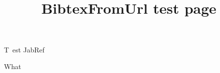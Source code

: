 \documentclass[12pt,a4paper]{article}
\begin{document}
\title{BibtexFromUrl test page}

\maketitle

T~\cite{html-50:online}est\cite{test1} \cite{test2} \cite{select} JabRef~\cite{JabRe89:online}

What~\cite{Whyarega29:online} 

\raggedright

\end{document}
